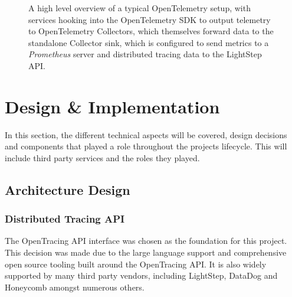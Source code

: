 \documentclass[12pt,pdftex,titlepage]{report}
\begin{document}
                \begin{figure}[hbt!]
                    \centering
                    \caption{A high level overview of a typical OpenTelemetry setup, with services hooking into the OpenTelemetry SDK to output telemetry to
                    OpenTelemetry Collectors, which themselves forward data to the standalone Collector sink, which is configured to send metrics to a \textit{Prometheus}
                    server and distributed tracing data to the LightStep API.}
                    \label{fig:otexporter}
                \end{figure}
                

    \chapter{Design \& Implementation}
        \small{In this section, the different technical aspects will be covered, design decisions and components that played a role throughout the projects lifecycle.
        This will include third party services and the roles they played.}

        \section{Architecture Design}
            \subsection{Distributed Tracing API}
                The OpenTracing API interface was chosen as the foundation for this project. This decision was made due to the large language support and comprehensive open
                source tooling built around the OpenTracing API. It is also widely supported by many third party vendors, including LightStep, DataDog and Honeycomb amongst 
                numerous others.
\end{document}
